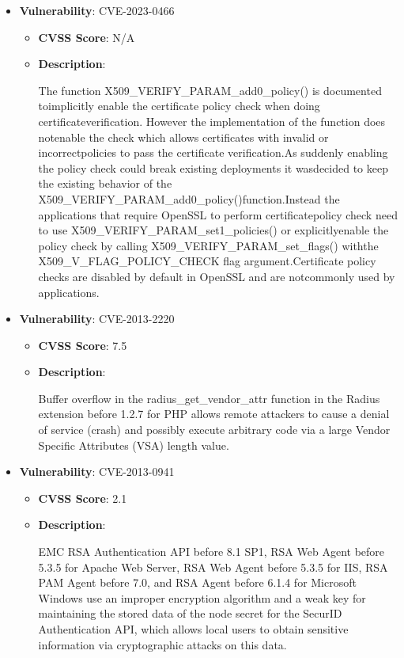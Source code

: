 \documentclass{article}
\begin{document}
\begin{itemize}
        \item \textbf{Vulnerability}: CVE-2023-0466
        \begin{itemize}
            \item \textbf{CVSS Score}:  N/A 
            \item \textbf{Description}:
            \parbox[t]{0.9\linewidth}{
                \ttfamily The function X509\_VERIFY\_PARAM\_add0\_policy() is documented toimplicitly enable the certificate policy check when doing certificateverification. However the implementation of the function does notenable the check which allows certificates with invalid or incorrectpolicies to pass the certificate verification.As suddenly enabling the policy check could break existing deployments it wasdecided to keep the existing behavior of the X509\_VERIFY\_PARAM\_add0\_policy()function.Instead the applications that require OpenSSL to perform certificatepolicy check need to use X509\_VERIFY\_PARAM\_set1\_policies() or explicitlyenable the policy check by calling X509\_VERIFY\_PARAM\_set\_flags() withthe X509\_V\_FLAG\_POLICY\_CHECK flag argument.Certificate policy checks are disabled by default in OpenSSL and are notcommonly used by applications.
            }
        \end{itemize}
    
        \item \textbf{Vulnerability}: CVE-2013-2220
        \begin{itemize}
            \item \textbf{CVSS Score}:  7.5 
            \item \textbf{Description}:
            \parbox[t]{0.9\linewidth}{
                \ttfamily Buffer overflow in the radius\_get\_vendor\_attr function in the Radius extension before 1.2.7 for PHP allows remote attackers to cause a denial of service (crash) and possibly execute arbitrary code via a large Vendor Specific Attributes (VSA) length value.
            }
        \end{itemize}
    
        \item \textbf{Vulnerability}: CVE-2013-0941
        \begin{itemize}
            \item \textbf{CVSS Score}:  2.1 
            \item \textbf{Description}:
            \parbox[t]{0.9\linewidth}{
                \ttfamily EMC RSA Authentication API before 8.1 SP1, RSA Web Agent before 5.3.5 for Apache Web Server, RSA Web Agent before 5.3.5 for IIS, RSA PAM Agent before 7.0, and RSA Agent before 6.1.4 for Microsoft Windows use an improper encryption algorithm and a weak key for maintaining the stored data of the node secret for the SecurID Authentication API, which allows local users to obtain sensitive information via cryptographic attacks on this data.
            }
        \end{itemize}
    

\end{itemize}
\end{document}
